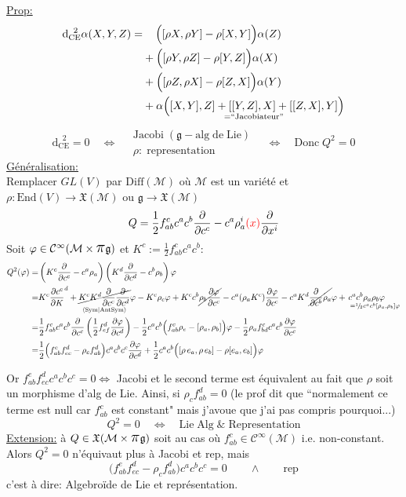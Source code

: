 \documentclass[a4paper,11pt]{article}
\renewcommand{\d}{{\mathrm{d}}}
\newcommand{\e}{{\mathrm{e}}}
\newcommand{\dr}[2]{\frac{\partial {#1}}{\partial{#2}}}
\newcommand{\ppi}{{\mathlarger{\mathlarger{\mathlarger{\pi}}}}}
\begin{document}
\noindent\underline{Prop:}
\begin{align*}
\d_\mathrm{CE}^{\;\;2} \alpha (X,Y,Z) =& \quad\, \Big([\rho X,\rho Y] - \rho[X,Y]\Big)\alpha(Z)\\
&+ \Big([\rho Y,\rho Z] - \rho[Y,Z]\Big)\alpha(X)\\
&+ \Big([\rho Z,\rho X] - \rho[Z,X]\Big)\alpha(Y)\\
&+ \alpha \Big(\underset{=``\mathrm{Jacobiateur}"}{[X,Y],Z]+[[Y,Z],X]+[[Z,X],Y]}\Big)
\end{align*}
$$\d_\mathrm{CE}^{\;\;2}=0 \quad \iff \quad \begin{matrix}
\mathrm{Jacobi}\;(\mathfrak{g}-\mathrm{alg}\;\d\e\;\mathrm{Lie})\\
\rho: \;\mathrm{representation}
\end{matrix} \quad \iff \quad \mathrm{Donc}\;Q^2=0$$
\underline{Généralisation:}\\
Remplacer $GL(V)$ par $\mathrm{Diff}(\mathcal M)$ où $\mathcal{M}$ est un variété et $\rho : 
\mathrm{End}(V) \to \mathfrak{X}(\mathcal{M})$ ou $\mathfrak{g}\to \mathfrak{X}(\mathcal{M})$
$$Q = \frac12f^c_{ab}c^ac^b\dr{}{c^c} - c^a\rho^i_a\color{red}(x)\color{black}\dr{}{x^i}$$
Soit $\varphi\in\mathcal{C}^\infty(\mathcal M\times\ppi\mathfrak{g})$ et $K^c:=\frac12f^c_{ab}c^ac^b$:
\begin{align*}
Q^2(\varphi) =& \left( K^c\dr{}{c^c} - c^a\rho_a\right)\left(K^d\dr{}{c^d}-c^b\rho_b\right)\varphi\\
=& K^c\dr{c^c}K^d + \underset{\langle\mathrm{Sym}|\mathrm{AntSym}\rangle}{\cancel{K^cK^d\dr{}{c^c}\dr{}{c^d}}}\varphi - K^c\rho_c \varphi + K^cc^b\cancel{\rho_b\dr\varphi{c^c}} - c^a(\rho_aK^c)\dr\varphi{c^c} - c^aK^d\cancel{\dr{}{c^b}\rho_a}\varphi+\!\!\!\!\!\!\!\!\!\! \underset{\quad\quad =^1\!/\!_2c^ac^b[\rho_a,\rho_b]\varphi}{c^ac^b\rho_a\rho_b\varphi}\\
=&\frac12f^c_{ab}c^ac^b\dr{}{c^c}\left(\frac12f^d_{ef}\dr\varphi{c^d}\right) - \frac12c^ac^b\Big(f^c_{ab}\rho_e-[\rho_a,\rho_b]\Big)\varphi - \frac12 \rho_a f^c_{bd}c^ac^b\dr\varphi{c^c}\\
=& \frac12\Big(f^e_{ab}f^d_{ec}-\rho_cf^d_{ab} \Big)c^ac^bc^c \dr\varphi{c^d} +\frac12 c^ac^b\Big([\rho \,e_a,\rho \,e_b] - \rho [e_a,e_b] \Big)\varphi
\end{align*}

Or $f^e_{ab}f^d_{ec}c^ac^bc^c=0 \iff$ Jacobi et le second terme est équivalent au fait que $\rho$ soit un morphisme d'alg de Lie. Ainsi, si $\rho_cf^d_{ab}=0$ (le prof dit que ``normalement ce terme est null car $f^c_{ab}$ est constant" mais j'avoue que j'ai pas compris pourquoi...)
$$Q^2=0 \quad \iff\quad \mathrm{Lie}\;\mathrm{Alg}\;\&\;\mathrm{Representation}$$
\underline{Extension:}
à $Q\in\mathfrak X(\mathcal{M}\times\ppi\mathfrak g)$ soit au cas où $f^c_{ab}\in\mathcal{C}^\infty(\mathcal M)$ i.e. non-constant. Alors $Q^2=0$ n'équivaut plus à Jacobi et rep, mais
$$\Big(f^e_{ab}f^d_{ec}-\rho_cf^d_{ab} \Big)c^ac^bc^c=0 \quad\quad\wedge\quad\quad \mathrm{rep}$$
c'est à dire: Algebr\color{red}oïde \color{black} de Lie et représentation.
\end{document}
